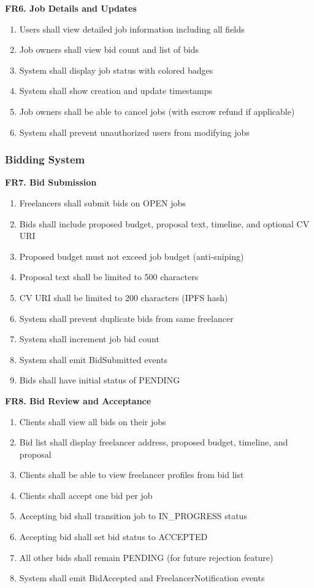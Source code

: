 \documentclass[a4paper,13pt,twoside]{report}
\theoremstyle{definition}
\begin{document}
\textbf{FR6. Job Details and Updates}

\begin{enumerate}
    \item Users shall view detailed job information including all fields
    \item Job owners shall view bid count and list of bids
    \item System shall display job status with colored badges
    \item System shall show creation and update timestamps
    \item Job owners shall be able to cancel jobs (with escrow refund if applicable)
    \item System shall prevent unauthorized users from modifying jobs
\end{enumerate}

\subsubsection{Bidding System}

\textbf{FR7. Bid Submission}

\begin{enumerate}
    \item Freelancers shall submit bids on OPEN jobs
    \item Bids shall include proposed budget, proposal text, timeline, and optional CV URI
    \item Proposed budget must not exceed job budget (anti-sniping)
    \item Proposal text shall be limited to 500 characters
    \item CV URI shall be limited to 200 characters (IPFS hash)
    \item System shall prevent duplicate bids from same freelancer
    \item System shall increment job bid count
    \item System shall emit BidSubmitted events
    \item Bids shall have initial status of PENDING
\end{enumerate}

\textbf{FR8. Bid Review and Acceptance}

\begin{enumerate}
    \item Clients shall view all bids on their jobs
    \item Bid list shall display freelancer address, proposed budget, timeline, and proposal
    \item Clients shall be able to view freelancer profiles from bid list
    \item Clients shall accept one bid per job
    \item Accepting bid shall transition job to IN\_PROGRESS status
    \item Accepting bid shall set bid status to ACCEPTED
    \item All other bids shall remain PENDING (for future rejection feature)
    \item System shall emit BidAccepted and FreelancerNotification events
\end{enumerate}
\end{document}
